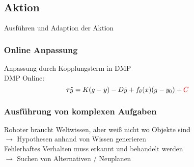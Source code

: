 \subsection{Aktion}%
\label{pdv:sub:aktion}
Ausführen und Adaption der Aktion

\subsubsection{Online Anpassung}%
\label{pdv:ssub:online-anpassung}
Anpassung durch Kopplungsterm in DMP\\
DMP Online: \[\tau\ddot{y} = K (g-y)-D\dot{y} + f_\theta(x)(g-y_0) + \color{red}C\]

\subsubsection{Ausführung von komplexen Aufgaben}%
\label{pdv:ssub:ausfuehrung-von-komplexen-aufgaben}
Roboter braucht Weltwissen, aber weiß nicht wo Objekte sind\\
\(\rightarrow\) Hypothesen anhand von Wissen generieren\\

Fehlerhaftes Verhalten muss erkannt und behandelt werden\\
\(\rightarrow\) Suchen von Alternativen / Neuplanen

